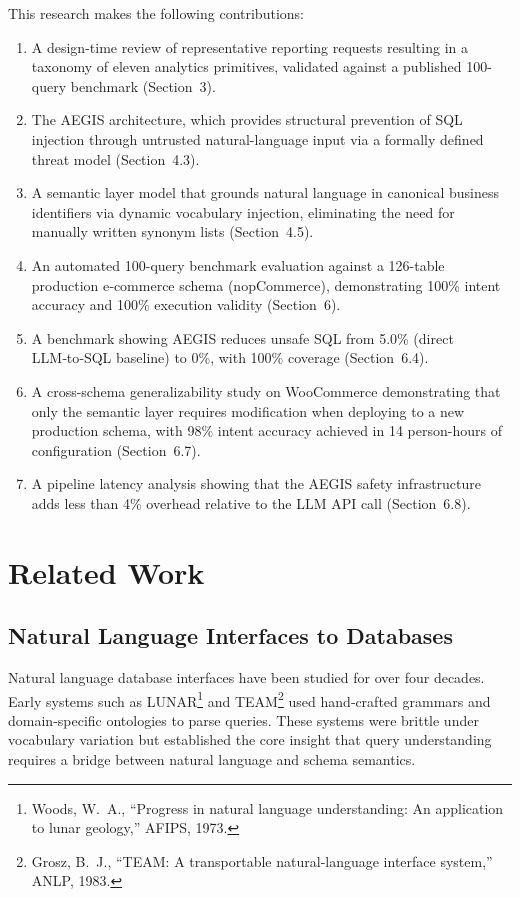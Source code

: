 \documentclass[11pt]{article}
\begin{document}
This research makes the following contributions:
\begin{enumerate}
  \item A design-time review of representative reporting requests resulting in a taxonomy of eleven analytics primitives, validated against a published 100-query benchmark (Section~3).
  \item The AEGIS architecture, which provides structural prevention of SQL injection through untrusted natural-language input via a formally defined threat model (Section~4.3).
  \item A semantic layer model that grounds natural language in canonical business identifiers via dynamic vocabulary injection, eliminating the need for manually written synonym lists (Section~4.5).
  \item An automated 100-query benchmark evaluation against a 126-table production e‑commerce schema (nopCommerce), demonstrating 100\% intent accuracy and 100\% execution validity (Section~6).
  \item A benchmark showing AEGIS reduces unsafe SQL from 5.0\% (direct LLM‑to‑SQL baseline) to 0\%, with 100\% coverage (Section~6.4).
  \item A cross-schema generalizability study on WooCommerce demonstrating that only the semantic layer requires modification when deploying to a new production schema, with 98\% intent accuracy achieved in 14 person-hours of configuration (Section~6.7).
  \item A pipeline latency analysis showing that the AEGIS safety infrastructure adds less than 4\% overhead relative to the LLM API call (Section~6.8).
\end{enumerate}

\section{Related Work}
\subsection{Natural Language Interfaces to Databases}
Natural language database interfaces have been studied for over four decades. Early systems such as LUNAR\footnote{Woods, W.~A., ``Progress in natural language understanding: An application to lunar geology,'' AFIPS, 1973.} and TEAM\footnote{Grosz, B.~J., ``TEAM: A transportable natural‑language interface system,'' ANLP, 1983.} used hand‑crafted grammars and domain‑specific ontologies to parse queries. These systems were brittle under vocabulary variation but established the core insight that query understanding requires a bridge between natural language and schema semantics.
\end{document}
